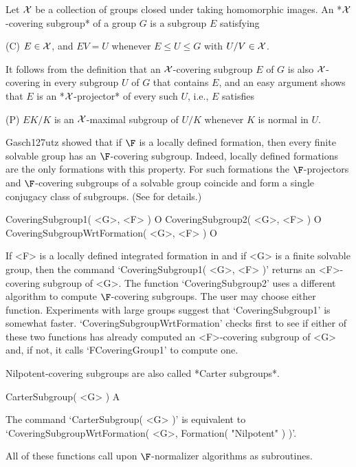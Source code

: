 
\def\X{{\cal{X}}}


Let $\X$ be a collection of groups closed under taking homomorphic images.
An *$\X$-covering subgroup* of a group $G$ is a subgroup $E$ satisfying

(C) \qquad $E \in \X$, and $EV = U$ whenever $E \le U \le G$ with $U/V \in
\X$.

It follows from the definition that an $\X$-covering subgroup $E$ of $G$ is
also $\X$-covering in every subgroup $U$ of $G$ that contains $E$, and an
easy argument shows that $E$ is an *$\X$-projector* of every such $U$,
i.e., $E$ satisfies

(P) \qquad $EK/K$ is an $\X$-maximal subgroup of $U/K$ whenever $K$ is
normal in $U$.

Gasch{\accent127u}tz showed that if $\F$ is a locally defined formation,
then every finite solvable group has an $\F$-covering subgroup. Indeed,
locally defined formations are the only formations with this property. For
such formations the $\F$-projectors and $\F$-covering subgroups of a
solvable group coincide and form a single conjugacy class of subgroups.
(See \cite{DH} for details.)

\> CoveringSubgroup1( <G>, <F> ) O
\> CoveringSubgroup2( <G>, <F> ) O
\> CoveringSubgroupWrtFormation( <G>, <F> ) O

If <F> is a locally defined integrated formation in {\GAP} and if <G> is
a finite solvable group, then the command `CoveringSubgroup1( <G>, <F> )'
returns an <F>-covering subgroup of <G>.
The function `CoveringSubgroup2' uses a different algorithm to compute
$\F$-covering subgroups. The user may choose either function. Experiments with large groups suggest that `CoveringSubgroup1' is somewhat faster.
`CoveringSubgroupWrtFormation' checks first to see if either of these
two functions has already computed an <F>-covering subgroup of <G> and, if
not, it  calls `FCoveringGroup1' to compute one. 

\medskip
Nilpotent-covering subgroups are also called *Carter subgroups*.

\> CarterSubgroup( <G> ) A

The command `CarterSubgroup( <G> )' is equivalent to 
`CoveringSubgroupWrtFormation( <G>, Formation( "Nilpotent" ) )'.

\medskip
All of these functions call upon $\F$-normalizer algorithms as subroutines.
